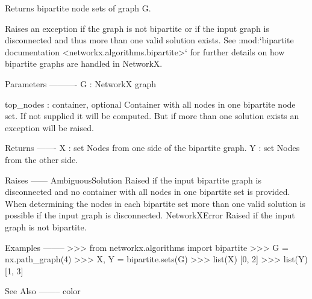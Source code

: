 \begin{DoxyVerb}Returns bipartite node sets of graph G.

Raises an exception if the graph is not bipartite or if the input
graph is disconnected and thus more than one valid solution exists.
See :mod:`bipartite documentation <networkx.algorithms.bipartite>`
for further details on how bipartite graphs are handled in NetworkX.

Parameters
----------
G : NetworkX graph

top_nodes : container, optional
  Container with all nodes in one bipartite node set. If not supplied
  it will be computed. But if more than one solution exists an exception
  will be raised.

Returns
-------
X : set
  Nodes from one side of the bipartite graph.
Y : set
  Nodes from the other side.

Raises
------
AmbiguousSolution
  Raised if the input bipartite graph is disconnected and no container
  with all nodes in one bipartite set is provided. When determining
  the nodes in each bipartite set more than one valid solution is
  possible if the input graph is disconnected.
NetworkXError
  Raised if the input graph is not bipartite.

Examples
--------
>>> from networkx.algorithms import bipartite
>>> G = nx.path_graph(4)
>>> X, Y = bipartite.sets(G)
>>> list(X)
[0, 2]
>>> list(Y)
[1, 3]

See Also
--------
color\end{DoxyVerb}
 